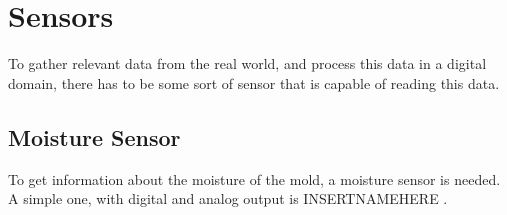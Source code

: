 \section{Sensors}
To gather relevant data from the real world, and process this data in a digital domain, there has to be some sort of sensor that is capable of reading this data.

\subsection{Moisture Sensor}
To get information about the moisture of the mold, a moisture sensor is needed. A simple one, with digital and analog output is INSERTNAMEHERE .

